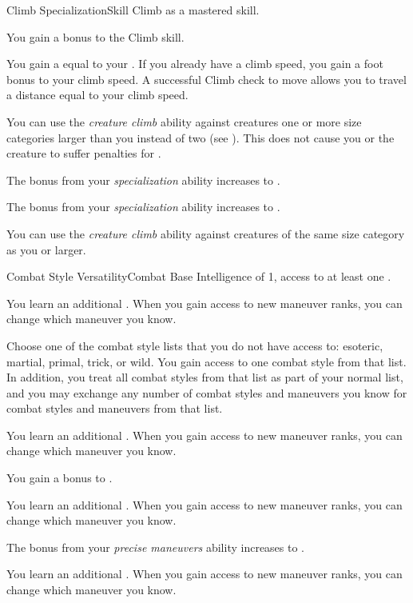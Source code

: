     \begin{feat}{Climb Specialization}{Skill}
        \featpre Climb as a mastered skill.

         You gain a  bonus to the Climb skill.

         You gain a  equal to your .
        If you already have a climb speed, you gain a  foot bonus to your climb speed.
        A successful Climb check to move allows you to travel a distance equal to your climb speed.

         You can use the \textit{creature climb} ability against creatures one or more size categories larger than you instead of two (see ).
        This does not cause you or the creature to suffer penalties for \squeezing.

         The bonus from your \textit{specialization} ability increases to .


         The bonus from your \textit{specialization} ability increases to .

         You can use the \textit{creature climb} ability against creatures of the same size category as you or larger.
    \end{feat}

    \begin{feat}{Combat Style Versatility}{Combat}
        \featpre Base Intelligence of 1, access to at least one .

         You learn an additional .
        When you gain access to new maneuver ranks, you can change which maneuver you know.

         Choose one of the combat style lists that you do not have access to: esoteric, martial, primal, trick, or wild.
        You gain access to one combat style from that list.
        In addition, you treat all combat styles from that list as part of your normal list, and you may exchange any number of combat styles and maneuvers you know for combat styles and maneuvers from that list.

         You learn an additional .
        When you gain access to new maneuver ranks, you can change which maneuver you know.

         You gain a  bonus to .

         You learn an additional .
        When you gain access to new maneuver ranks, you can change which maneuver you know.

         The bonus from your \textit{precise maneuvers} ability increases to .

         You learn an additional .
        When you gain access to new maneuver ranks, you can change which maneuver you know.
    \end{feat}

